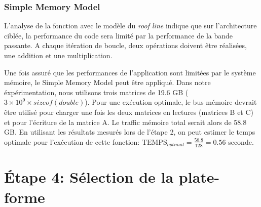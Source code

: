 \subsubsection{Simple Memory Model} \label{sec:smm}
L'analyse de la fonction avec le modèle du \textit{roof line} indique que sur l'architecture ciblée, la performance du code sera limité par la performance de la bande passante.
A chaque itération de boucle, deux opérations doivent être réalisées, une addition et une multiplication. 

Une fois assuré que les performances de l'application sont limitées par le système mémoire, le Simple Memory Model peut être appliqué. Dans notre éxpérimentation, nous utilisons trois matrices de 19.6 GB ($3 \times 10^9 \times sizeof(double)$). Pour une exécution optimale, le bus mémoire devrait être utilisé pour charger une fois les deux matrices en lectures (matrices B et C)  et pour l'écriture de la matrice A. Le traffic mémoire total serait alors de 58.8 GB. En utilisant les résultats mesurés lors de l'étape 2, on peut estimer le temps optimale pour l'exécution de cette fonction: $\text{TEMPS}_{optimal} = \frac{58.8}{128} = 0.56$ seconde.










\section{Étape 4: Sélection de la plate-forme}


